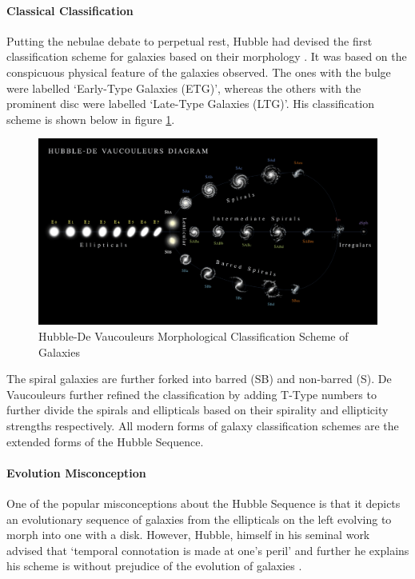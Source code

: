 \paragraph{Classical Classification}
Putting the nebulae debate to perpetual rest, Hubble had devised the first classification scheme for galaxies based on their morphology \parencite*{hubble_relation_1929}. It was based on the conspicuous physical feature of the galaxies observed. The ones with the bulge were labelled `Early-Type Galaxies (ETG)', whereas the others with the prominent disc were labelled `Late-Type Galaxies (LTG)'. His classification scheme is shown below in figure \ref{hdv}.
\begin{figure}[H]
	\centering
	\includegraphics[width=\linewidth, height=\textheight, keepaspectratio]{images/galaxies/ddiagram.png}
	\caption{Hubble-De Vaucouleurs Morphological Classification Scheme of Galaxies}
	\label{hdv}
\end{figure}
The spiral galaxies are further forked into barred (SB) and non-barred (S). De Vaucouleurs further refined the classification by adding T-Type numbers to further divide the spirals and ellipticals based on their spirality and ellipticity strengths respectively. All modern forms of galaxy classification schemes are the extended forms of the Hubble Sequence.

\paragraph{Evolution Misconception}
One of the popular misconceptions about the Hubble Sequence is that it depicts an evolutionary sequence of galaxies from the ellipticals on the left evolving to morph into one with a disk. However, Hubble, himself in his seminal work advised that `temporal connotation is made at one's peril' and further he explains his scheme is without prejudice of the evolution of galaxies \parencite[277]{hubble_realm_2013}.

